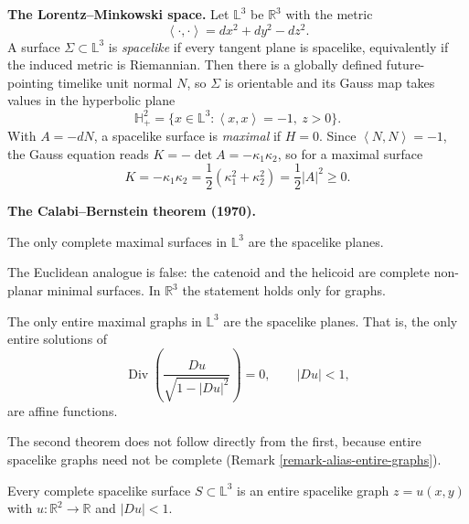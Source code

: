 \medskip\noindent
{\bf The Lorentz--Minkowski space.}
Let $\mathbb{L}^3$ be $\mathbb{R}^3$ with
the metric
$$
\left\langle{} \cdot,\cdot
\right\rangle{}=dx^2+dy^2-dz^2.
$$
A surface $\Sigma\subset\mathbb{L}^3$ is
\emph{spacelike} if every tangent plane is
spacelike, equivalently if the induced
metric is Riemannian. Then there is a
globally defined future-pointing timelike
unit normal $N$, so $\Sigma$ is orientable
and its Gauss map takes values in the
hyperbolic plane
$$
\mathbb{H}^2_+=\{x\in\mathbb{L}^3:
\left\langle{} x,x\right\rangle{}=-1,
\ z>0\}.
$$
With $A=-dN$, a spacelike surface is
\emph{maximal} if $H=0$. Since
$\left\langle{} N,N\right\rangle{}=-1$, the
Gauss equation reads $K=-\det A
=-\kappa_1\kappa_2$, so for a maximal
surface
$$
K=-\kappa_1\kappa_2
=\frac{1}{2}(\kappa_1^2+\kappa_2^2)
=\frac{1}{2}|A|^2\geq 0.
$$

\medskip\noindent
{\bf The Calabi--Bernstein theorem
(1970).}

\begin{theorem}
\label{theorem-alias-calabi-bernstein}
The only complete maximal surfaces in
$\mathbb{L}^3$ are the spacelike planes.
\end{theorem}

\begin{remark}
\label{remark-alias-euclidean-fails}
The Euclidean analogue is false: the
catenoid and the helicoid are complete
non-planar minimal surfaces. In
$\mathbb{R}^3$ the statement holds only
for graphs.
\end{remark}

\begin{theorem}
\label{theorem-alias-calabi-bernstein-graphs}
The only entire maximal graphs in
$\mathbb{L}^3$ are the spacelike planes.
That is, the only entire solutions of
$$
\operatorname{Div}\left(
\frac{Du}{\sqrt{1-|Du|^2}}
\right)=0,
\qquad
|Du|<1,
$$
are affine functions.
\end{theorem}

The second theorem does not follow
directly from the first, because entire
spacelike graphs need not be complete
(Remark \ref{remark-alias-entire-graphs}).

\begin{lemma}
\label{lemma-alias-complete-spacelike}
Every complete spacelike surface
$S\subset\mathbb{L}^3$ is an entire
spacelike graph $z=u(x,y)$ with
$u:\mathbb{R}^2\to\mathbb{R}$ and
$|Du|<1$.
\end{lemma}


